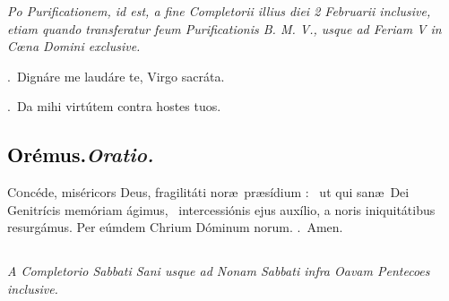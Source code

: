\documentclass[12pt]{article} %
\newenvironment{rubric}{\vspace{1 mm}\color{benred8} \itshape \leftskip 0in \setlength{\parindent}{0.25in}}{\vspace{1 mm}}
\newenvironment{response}{\leftskip 0in \setlength{\parindent}{0in}}{\vspace{1 mm}}
\let\oldgresixstar\gresixstar
\renewcommand{\gresixstar}{\textcolor{benred8}{\oldgresixstar}}
\let\oldgredagger\gredagger
\renewcommand{\gredagger}{\textcolor{benred8}{\oldgredagger}}
\let\oldVbar\Vbar
\renewcommand{\Vbar}{\textcolor{benred8}{\oldVbar .}}
\let\oldRbar\Rbar
\renewcommand{\Rbar}{\textcolor{benred8}{\oldRbar .}}
\def\capitulumSpace{\hspace{20 mm}}
\begin{document}

\newpage

\begin{rubric}Po Purificationem, id est, a fine Completorii illius diei 2 Februarii inclusive, etiam quando transferatur feum Purificationis B. M. V., usque ad Feriam V in C\oe na Domini exclusive.\end{rubric}


\gresetfirstlineaboveinitial{\small \textsc{ \textbf{\textcolor{benred8}{VI}}}}{\small \textsc{ \textbf{\textcolor{benred8}{VI}}}}

\vspace{2mm}

\begin{response}
\Vbar\ Dign\'{a}re me laud\'{a}re te, Virgo sacr\'{a}ta.

\Rbar\ Da mihi virt\'{u}tem contra hostes tuos.

\end{response}

\subsection*{\textcolor{black}{Or\'{e}mus.}\capitulumSpace \emph{Oratio.}}

\begin{response}\lettrine{C}{o}nc\'{e}de, mis\'{e}ricors Deus, fragilit\'{a}ti nor\ae\ pr\ae s\'{i}dium : \gredagger\ ut qui san\ae\ Dei Genitr\'{i}cis mem\'{o}riam \'{a}gimus, \gresixstar\ intercessi\'{o}nis ejus aux\'{i}lio, a noris iniquit\'{a}tibus resurg\'{a}mus. Per e\'{u}mdem Chrium D\'{o}minum norum. \Rbar\ Amen.

\end{response}


\subsection*{}

\begin{rubric}
A Completorio Sabbati Sani usque ad Nonam Sabbati infra Oavam Pentecoes inclusive.

\end{rubric}
\end{document}
